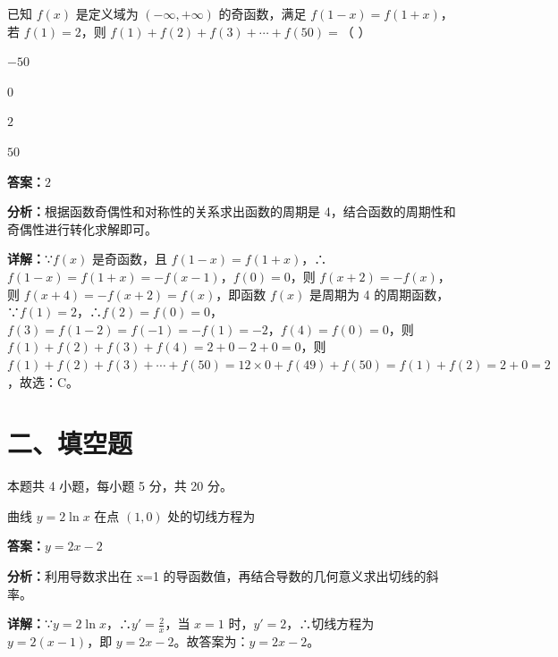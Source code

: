 \begin{question}[points=5]
已知 $f(x)$ 是定义域为 $(-\infty,+\infty)$ 的奇函数，满足 $f(1-x)=f(1+x)$，若 $f(1)=2$，则 $f(1)+f(2)+f(3)+\cdots+f(50)=$（ ）
\begin{choices}
  \item $-50$
  \item $0$
  \item $2$
  \item $50$
\end{choices}
\begin{solution}
\textbf{答案：}$2$

\textbf{分析：}根据函数奇偶性和对称性的关系求出函数的周期是 4，结合函数的周期性和奇偶性进行转化求解即可。

\textbf{详解：}∵$f(x)$ 是奇函数，且 $f(1-x)=f(1+x)$，∴$f(1-x)=f(1+x)=-f(x-1)$，$f(0)=0$，则 $f(x+2)=-f(x)$，则 $f(x+4)=-f(x+2)=f(x)$，即函数 $f(x)$ 是周期为 4 的周期函数，∵$f(1)=2$，∴$f(2)=f(0)=0$，$f(3)=f(1-2)=f(-1)=-f(1)=-2$，$f(4)=f(0)=0$，则 $f(1)+f(2)+f(3)+f(4)=2+0-2+0=0$，则 $f(1)+f(2)+f(3)+\cdots+f(50)=12\times0+f(49)+f(50)=f(1)+f(2)=2+0=2$，故选：C。
\end{solution}
\end{question}

\section*{二、填空题}
本题共 4 小题，每小题 5 分，共 20 分。

\begin{question}[points=5]
曲线 $y=2\ln x$ 在点 $(1,0)$ 处的切线方程为
\fillin[{$y=2x-2$}]
\begin{solution}
\textbf{答案：}$y=2x-2$

\textbf{分析：}利用导数求出在 x=1 的导函数值，再结合导数的几何意义求出切线的斜率。

\textbf{详解：}∵$y=2\ln x$，∴$y'=\frac{2}{x}$，当 $x=1$ 时，$y'=2$，∴切线方程为 $y=2(x-1)$，即 $y=2x-2$。故答案为：$y=2x-2$。
\end{solution}
\end{question}

